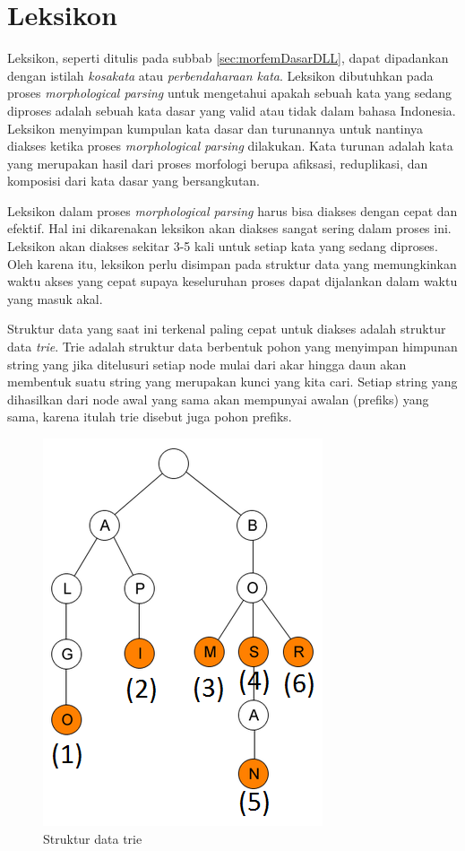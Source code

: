 \section{Leksikon}
\label{sec:leksikon}
Leksikon, seperti ditulis pada subbab \ref{sec:morfemDasarDLL}, dapat dipadankan dengan istilah \textit{kosakata} atau \textit{perbendaharaan kata}. Leksikon dibutuhkan pada proses \textit{morphological parsing} untuk mengetahui apakah sebuah kata yang sedang diproses adalah sebuah kata dasar yang valid atau tidak dalam bahasa Indonesia. Leksikon menyimpan kumpulan kata dasar dan turunannya untuk nantinya diakses ketika proses \textit{morphological parsing} dilakukan. Kata turunan adalah kata yang merupakan hasil dari proses morfologi berupa afiksasi, reduplikasi, dan komposisi dari kata dasar yang bersangkutan.

Leksikon dalam proses \textit{morphological parsing} harus bisa diakses dengan cepat dan efektif. Hal ini dikarenakan leksikon akan diakses sangat sering dalam proses ini. Leksikon akan diakses sekitar 3-5 kali untuk setiap kata yang sedang diproses. Oleh karena itu, leksikon perlu disimpan pada struktur data yang memungkinkan waktu akses yang cepat supaya keseluruhan proses dapat dijalankan dalam waktu yang masuk akal. 

Struktur data yang saat ini terkenal paling cepat untuk diakses adalah struktur data \textit{trie}. Trie adalah struktur data berbentuk pohon yang menyimpan himpunan string yang jika ditelusuri setiap node mulai dari akar hingga daun akan membentuk suatu string yang merupakan kunci yang kita cari. Setiap string yang dihasilkan dari node awal yang sama akan mempunyai awalan (prefiks) yang sama, karena itulah trie disebut juga pohon prefiks.

\begin{figure}[H]
\centering
\includegraphics[scale=0.75]{Gambar/gambar-trie}
\caption[Struktur data trie]{Struktur data trie} 
\label{bagan-trie}
\end{figure}

